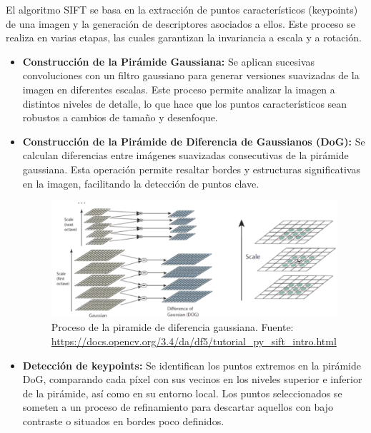 \documentclass[a4paper]{article}
\begin{document}
  El algoritmo SIFT se basa en la extracción de puntos característicos (keypoints) de una imagen y la generación de descriptores asociados a ellos. Este proceso se realiza en varias etapas, las cuales garantizan la invariancia a escala y a rotación.
  
  \begin{itemize}
      \item \textbf{Construcción de la Pirámide Gaussiana:}  
      Se aplican sucesivas convoluciones con un filtro gaussiano para generar versiones suavizadas de la imagen en diferentes escalas. Este proceso permite analizar la imagen a distintos niveles de detalle, lo que hace que los puntos característicos sean robustos a cambios de tamaño y desenfoque.
      
      \item \textbf{Construcción de la Pirámide de Diferencia de Gaussianos (DoG):}  
      Se calculan diferencias entre imágenes suavizadas consecutivas de la pirámide gaussiana. Esta operación permite resaltar bordes y estructuras significativas en la imagen, facilitando la detección de puntos clave.
      
      \begin{figure}[H]
        \centering
        \includegraphics[width=1.1\textwidth]{images/sift_gauss.png}
        \caption{Proceso de la piramide de diferencia gaussiana. Fuente: \url{https://docs.opencv.org/3.4/da/df5/tutorial_py_sift_intro.html}}
    \end{figure}
    
      \item \textbf{Detección de keypoints:}  
      Se identifican los puntos extremos en la pirámide DoG, comparando cada píxel con sus vecinos en los niveles superior e inferior de la pirámide, así como en su entorno local. Los puntos seleccionados se someten a un proceso de refinamiento para descartar aquellos con bajo contraste o situados en bordes poco definidos.
      

\end{itemize}
\end{document}
